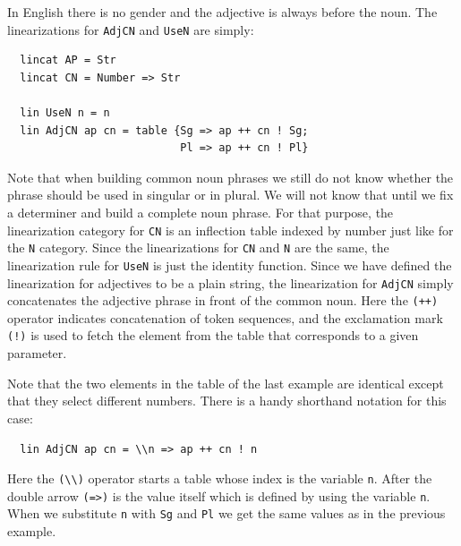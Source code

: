 \documentclass[output=paper]{LSP/langsci}
\begin{document}
In English there is no gender and the adjective is always before the noun. The linearizations for \verb=AdjCN= and \verb=UseN= are simply:
\begin{verbatim}
  lincat AP = Str
  lincat CN = Number => Str

  lin UseN n = n
  lin AdjCN ap cn = table {Sg => ap ++ cn ! Sg;
                           Pl => ap ++ cn ! Pl}
\end{verbatim}
Note that when building common noun phrases we still do not know whether 
the phrase should be used in singular or in plural. We will not know that
until we fix a determiner and build a complete noun phrase. 
For that purpose, the linearization category for \verb=CN= is 
an inflection table indexed by number just like for the 
\verb=N= category. Since the linearizations for 
\verb=CN= and \verb=N= are the same, the linearization rule for 
\verb=UseN= is just the identity function. Since we have defined 
the linearization for adjectives to be a plain string, 
the linearization for \verb=AdjCN= simply concatenates 
the adjective phrase in front of the common noun. Here the \verb=(++)=
operator indicates concatenation of token sequences, and 
the exclamation mark \verb=(!)= is used to fetch the element 
from the table that corresponds to a given parameter.

Note that the two elements in the table of the last example are identical
except that they select different numbers. There is a handy shorthand
notation for this case:
\begin{verbatim}
  lin AdjCN ap cn = \\n => ap ++ cn ! n
\end{verbatim}
Here the \verb=(\\)= operator starts a table whose index is the variable
\verb=n=. After the double arrow \verb/(=>)/ is the value itself 
which is defined by using the variable \verb=n=. When we
substitute \verb=n= with \verb=Sg= and \verb=Pl= we get the same values
as in the previous example.
\end{document}
